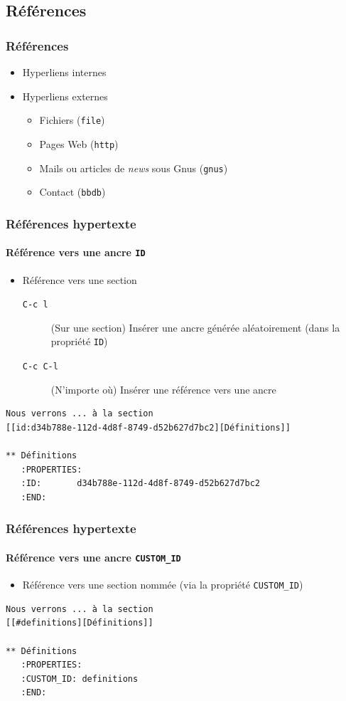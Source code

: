 \documentclass[presentation,t,hideothersubsections]{beamer}
\begin{document}
\subsection{Références}
\label{sec-2-8}
\begin{frame}
\frametitle{Références}
\label{sec-2-8-1}


\begin{itemize}
\item Hyperliens internes
\item Hyperliens externes
\begin{itemize}
\item Fichiers (\texttt{file})
\item Pages Web (\texttt{http})
\item Mails ou articles de \emph{news} sous Gnus (\texttt{gnus})
\item Contact (\texttt{bbdb})
\end{itemize}
\end{itemize}
\end{frame}
\begin{frame}[fragile]
\frametitle{Références hypertexte}
\framesubtitle{Référence vers une ancre \texttt{ID}}
\label{sec-2-8-2}


\begin{itemize}
\item Référence vers une section
\begin{description}
\item[\texttt{C-c l}] (Sur une section) Insérer une ancre générée aléatoirement (dans
    la propriété \texttt{ID})
\item[\texttt{C-c C-l}] (N'importe où) Insérer une référence vers une ancre
\end{description}
\end{itemize}


\lstset{language=org}
\begin{lstlisting}
Nous verrons ... à la section
[[id:d34b788e-112d-4d8f-8749-d52b627d7bc2][Définitions]]

** Définitions
   :PROPERTIES:
   :ID:       d34b788e-112d-4d8f-8749-d52b627d7bc2
   :END:
\end{lstlisting}
\end{frame}
\begin{frame}[fragile]
\frametitle{Références hypertexte}
\framesubtitle{Référence vers une ancre \texttt{CUSTOM\_ID}}
\label{sec-2-8-3}


\begin{itemize}
\item Référence vers une section nommée (via la propriété \texttt{CUSTOM\_ID})
\end{itemize}


\lstset{language=org}
\begin{lstlisting}
Nous verrons ... à la section
[[#definitions][Définitions]]

** Définitions
   :PROPERTIES:
   :CUSTOM_ID: definitions
   :END:
\end{lstlisting}
\end{frame}
\end{document}
